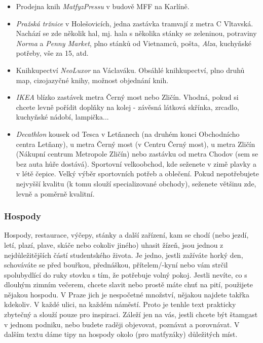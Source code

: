 \begin{itemize}
\item Prodejna knih \textit{MatfyzPressu} v budově MFF na Karlíně.
\item \textit{Pražská tržnice} v Holešovicích, jedna zastávka tramvají z metra C
Vltavská. Nachází se zde několik hal, mj. hala s několika stánky se zeleninou,
potraviny \textit{Norma} a \textit{Penny Market}, plno stánků od Vietnamců,
pošta, \textit{Alza}, kuchyňské potřeby, vše za 15, atd.
\item Knihkupectví \textit{ NeoLuxor} na Václaváku. Obsáhlé knihkupectví, plno
druhů map, cizojazyčné knihy, možnost objednání knih.
\item \textit{IKEA} blízko zastávek metra Černý most nebo Zličín. Vhodná, pokud
si chcete levně pořídit doplňky na kolej - závěsná látková skřínka, zrcadlo,
kuchyňské nádobí, lampička...
\item \textit{Decathlon} kousek od Tesca v Letňanech (na druhém konci
Obchodnícho centra Letňany), u metra Černý most (v Centru Černý most), u metra
Zličín (Nákupní centrum Metropole Zličín) nebo zastávku od metra Chodov (sem se
bez auta hůře dostává). Sportovní velkoobchod, kde seženete v zimě plavky a v
létě čepice. Velký výběr sportovních potřeb a oblečení. Pokud nepotřebujete
nejvyšší kvalitu (k tomu slouží specializované obchody), seženete většinu zde,
levně a poměrně kvalitní.
\end{itemize}


\subsubsection{Hospody}
Hospody, restaurace, výčepy, stánky a další zařízení, kam se chodí (nebo jezdí,
letí, plazí, plave, skáče nebo cokoliv jiného) uhasit žízeň, jsou jednou z
nejdůležitějších částí studentského života. Je jedno, jestli zažíváte horký den,
schováváte se před bouřkou, přednáškou, přítelem/-kyní nebo vám strčil
spolubydlící do ruky stovku s tím, že potřebuje volný pokoj. Jestli nevíte, co s
dlouhým zimním večerem, chcete slavit nebo prostě máte chuť na pití, použijete
nějakou hospodu. V Praze jich je nespočetné množství, nějakou najdete takřka
kdekoliv. V každé ulici, na každém náměstí. Proto je tenhle text prakticky
zbytečný a slouží pouze pro inspiraci. Záleží jen na vás, jestli chcete být
štamgast v jednom podniku, nebo budete raději objevovat, poznávat a porovnávat.
V dalším textu dáme tipy na hospody okolo (pro matfyzáky) důležitých míst.

